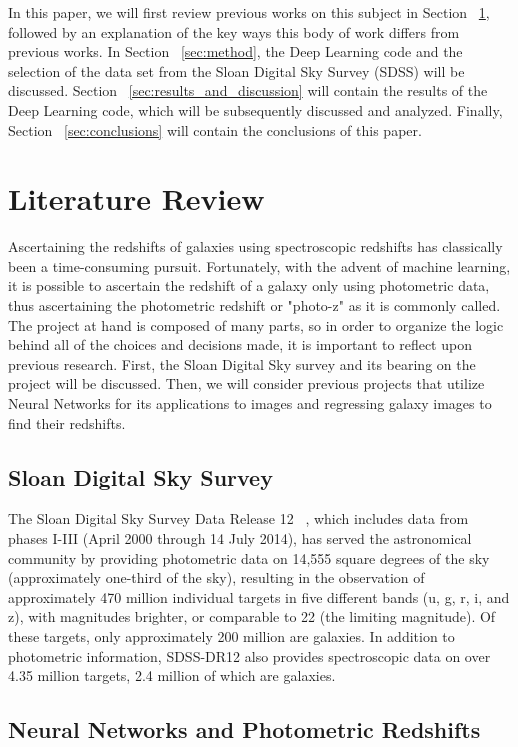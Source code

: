 \documentclass[fleqn,usenatbib]{mnras}
\begin{document}
In this paper, we will first review previous works on this subject in Section ~\ref{sec:review}, followed by an explanation of the key ways this body of work differs from previous works.  In Section ~\ref{sec:method}, the Deep Learning code and the selection of the data set from the Sloan Digital Sky Survey (SDSS) will be discussed.  Section ~\ref{sec:results_and_discussion} will contain the results of the Deep Learning code, which will be subsequently discussed and analyzed.  Finally, Section ~\ref{sec:conclusions} will contain the conclusions of this paper.

\section{Literature Review}
  \label{sec:review}
Ascertaining the redshifts of galaxies using spectroscopic redshifts has classically been a time-consuming pursuit.  Fortunately, with the advent of machine learning, it is possible to ascertain the redshift of a galaxy only using photometric data, thus ascertaining the photometric redshift or "photo-z" as it is commonly called.  The project at hand is composed of many parts, so in order to organize the logic behind all of the choices and decisions made, it is important to reflect upon previous research. First, the Sloan Digital Sky survey and its bearing on the project will be discussed.  Then, we will consider previous projects that utilize Neural Networks for its applications to images and regressing galaxy images to find their redshifts. 

\subsection{Sloan Digital Sky Survey}
  \label{sec:sdss}
The Sloan Digital Sky Survey Data Release 12 ~\citep[SDSS-DR12;][]{alam_DR12}, which includes data from phases I-III (April 2000 through 14 July 2014), has served the astronomical community by providing photometric data on 14,555 square degrees of the sky (approximately one-third of the sky), resulting in the observation of approximately 470 million individual targets in five different bands (u, g, r, i, and z), with magnitudes brighter, or comparable to 22 (the limiting magnitude). Of these targets, only approximately 200 million are galaxies.  In addition to photometric information, SDSS-DR12 also provides spectroscopic data on over 4.35 million targets, 2.4 million of which are galaxies.
  
\subsection{Neural Networks and Photometric Redshifts}
  \label{sec:nn_and_photoz}
\end{document}
